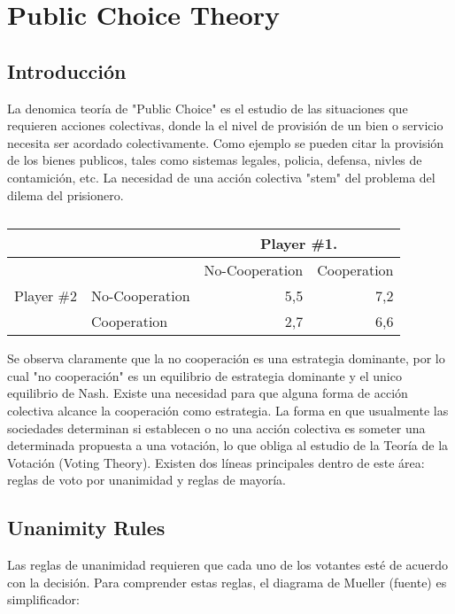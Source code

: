 \section{Public Choice Theory}
\subsection{Introducción}
La denomica teoría de "Public Choice" es el estudio de las situaciones que requieren acciones colectivas, donde la el nivel de provisión de un bien o servicio necesita ser acordado colectivamente. Como ejemplo se pueden citar la provisión de los bienes publicos, tales como sistemas legales, policia, defensa, nivles de contamición, etc. La necesidad de una acción colectiva "stem" del problema del dilema del prisionero.
 
\begin{table}[htbp]
\caption{}
\begin{tabular}{|l|l|r|l|}
\hline
 &  & \multicolumn{ 2}{c|}{Player \#1.} \\ \hline
 &  & \multicolumn{1}{l|}{No-Cooperation } & Cooperation \\ \hline
\multicolumn{ 1}{|c|}{Player \#2} & No-Cooperation & 5,5 & \multicolumn{1}{r|}{7,2} \\ \cline{ 2- 4}
\multicolumn{ 1}{|l|}{} & Cooperation & 2,7 & \multicolumn{1}{r|}{6,6} \\ \hline
\end{tabular}
\label{}
\end{table}

 
Se observa claramente que la no cooperación es una estrategia dominante, por lo cual "no cooperación" es un equilibrio de estrategia dominante y el unico equilibrio de Nash. Existe una necesidad para que alguna forma de acción colectiva alcance la cooperación como estrategia. La forma en que usualmente las sociedades determinan si establecen o no una acción colectiva es someter una determinada propuesta a una votación, lo que obliga al estudio de la Teoría de la Votación (Voting Theory). Existen dos líneas principales dentro de este área: reglas de voto por unanimidad y reglas de mayoría.
\subsection{Unanimity Rules}
Las reglas de unanimidad requieren que cada uno de los votantes esté de acuerdo con la decisión. Para comprender estas reglas, el diagrama de Mueller (fuente) es simplificador:
 
